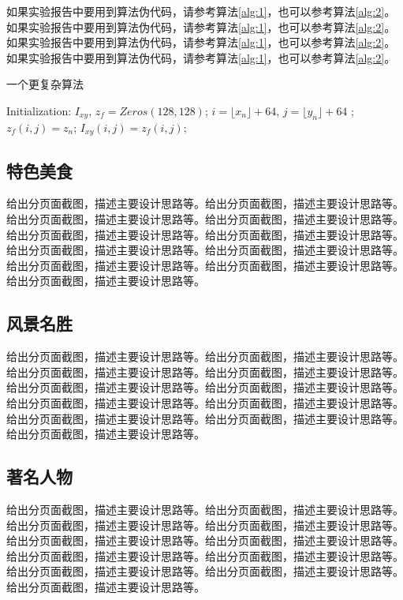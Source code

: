 \documentclass[supercite]{Experimental_Report}
\theoremstyle{definition}
\begin{document}
如果实验报告中要用到算法伪代码，请参考算法\ref{alg:1}，也可以参考算法\ref{alg:2}。如果实验报告中要用到算法伪代码，请参考算法\ref{alg:1}，也可以参考算法\ref{alg:2}。如果实验报告中要用到算法伪代码，请参考算法\ref{alg:1}，也可以参考算法\ref{alg:2}。如果实验报告中要用到算法伪代码，请参考算法\ref{alg:1}，也可以参考算法\ref{alg:2}。

\begin{algorithm}[h] 
	\caption{一个更复杂算法}
	\begin{algorithmic}[1]
		\State Initialization: $I_{xy}$, $z_{f}=Zeros(128, 128)$; 
		\State $i=\lfloor x_n \rfloor+64$, $j=\lfloor y_n \rfloor + 64$
		;
		\State $z_{f}(i,j)=z_n$;
		\EndIf
		\State $I_{xy}(i,j)=z_{f}(i,j)$;
		\EndFor 
	\end{algorithmic}\label{alg:2}
\end{algorithm}

\subsection{特色美食}

给出分页面截图，描述主要设计思路等。给出分页面截图，描述主要设计思路等。给出分页面截图，描述主要设计思路等。给出分页面截图，描述主要设计思路等。给出分页面截图，描述主要设计思路等。给出分页面截图，描述主要设计思路等。给出分页面截图，描述主要设计思路等。给出分页面截图，描述主要设计思路等。给出分页面截图，描述主要设计思路等。给出分页面截图，描述主要设计思路等。给出分页面截图，描述主要设计思路等。

\subsection{风景名胜}

给出分页面截图，描述主要设计思路等。给出分页面截图，描述主要设计思路等。给出分页面截图，描述主要设计思路等。给出分页面截图，描述主要设计思路等。给出分页面截图，描述主要设计思路等。给出分页面截图，描述主要设计思路等。给出分页面截图，描述主要设计思路等。给出分页面截图，描述主要设计思路等。给出分页面截图，描述主要设计思路等。给出分页面截图，描述主要设计思路等。给出分页面截图，描述主要设计思路等。

\subsection{著名人物}

给出分页面截图，描述主要设计思路等。给出分页面截图，描述主要设计思路等。给出分页面截图，描述主要设计思路等。给出分页面截图，描述主要设计思路等。给出分页面截图，描述主要设计思路等。给出分页面截图，描述主要设计思路等。给出分页面截图，描述主要设计思路等。给出分页面截图，描述主要设计思路等。给出分页面截图，描述主要设计思路等。给出分页面截图，描述主要设计思路等。给出分页面截图，描述主要设计思路等。
\end{document}
